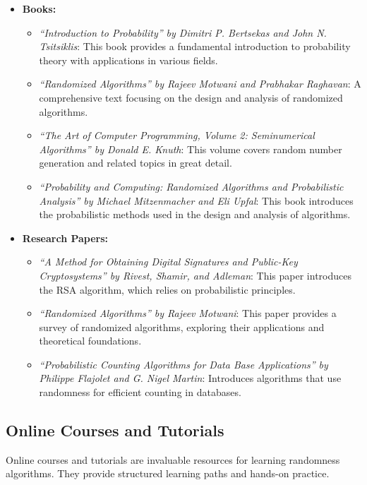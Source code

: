 \documentclass[12pt]{book} %
\begin{document}
\begin{itemize}
    \item \textbf{Books:}
        \begin{itemize}
            \item \textit{“Introduction to Probability” by Dimitri P. Bertsekas and John N. Tsitsiklis}: This book provides a fundamental introduction to probability theory with applications in various fields.
            \item \textit{“Randomized Algorithms” by Rajeev Motwani and Prabhakar Raghavan}: A comprehensive text focusing on the design and analysis of randomized algorithms.
            \item \textit{“The Art of Computer Programming, Volume 2: Seminumerical Algorithms” by Donald E. Knuth}: This volume covers random number generation and related topics in great detail.
            \item \textit{“Probability and Computing: Randomized Algorithms and Probabilistic Analysis” by Michael Mitzenmacher and Eli Upfal}: This book introduces the probabilistic methods used in the design and analysis of algorithms.
        \end{itemize}
    \item \textbf{Research Papers:}
        \begin{itemize}
            \item \textit{“A Method for Obtaining Digital Signatures and Public-Key Cryptosystems” by Rivest, Shamir, and Adleman}: This paper introduces the RSA algorithm, which relies on probabilistic principles.
            \item \textit{“Randomized Algorithms” by Rajeev Motwani}: This paper provides a survey of randomized algorithms, exploring their applications and theoretical foundations.
            \item \textit{“Probabilistic Counting Algorithms for Data Base Applications” by Philippe Flajolet and G. Nigel Martin}: Introduces algorithms that use randomness for efficient counting in databases.
        \end{itemize}
\end{itemize}

\subsection{Online Courses and Tutorials}
Online courses and tutorials are invaluable resources for learning randomness algorithms. They provide structured learning paths and hands-on practice.
\end{document}
